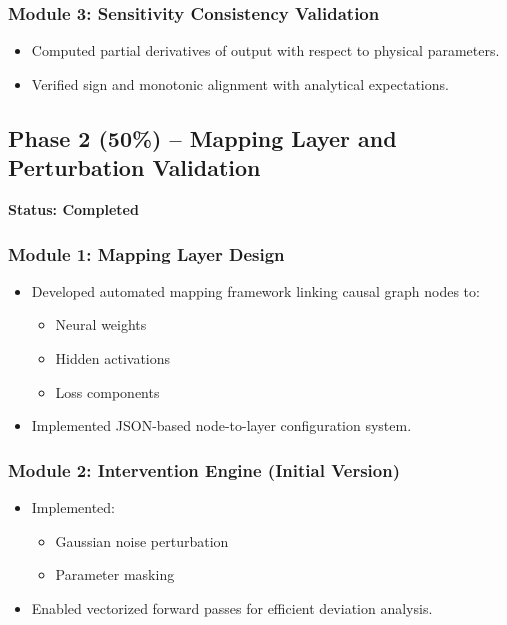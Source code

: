 \documentclass[12pt,singleside,a4paper]{article}
\begin{document}
\subsubsection*{Module 3: Sensitivity Consistency Validation}
\begin{itemize}
    \item Computed partial derivatives of output with respect to physical parameters.
    \item Verified sign and monotonic alignment with analytical expectations.
\end{itemize}

\vspace{0.5cm}

\subsection{Phase 2 (50\%) -- Mapping Layer and Perturbation Validation}
\textbf{Status: Completed}

\subsubsection*{Module 1: Mapping Layer Design}
\begin{itemize}
    \item Developed automated mapping framework linking causal graph nodes to:
    \begin{itemize}
        \item Neural weights
        \item Hidden activations
        \item Loss components
    \end{itemize}
    \item Implemented JSON-based node-to-layer configuration system.
\end{itemize}

\subsubsection*{Module 2: Intervention Engine (Initial Version)}
\begin{itemize}
    \item Implemented:
    \begin{itemize}
        \item Gaussian noise perturbation
        \item Parameter masking
    \end{itemize}
    \item Enabled vectorized forward passes for efficient deviation analysis.
\end{itemize}
\end{document}
